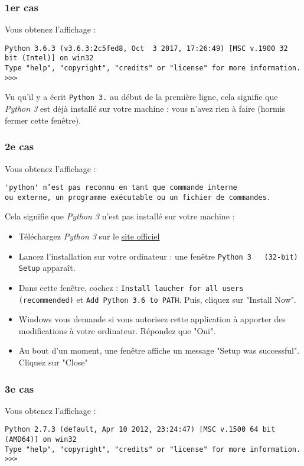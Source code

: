 \documentclass[11pt]{article}
\begin{document}
\subsubsection{1er cas}
\label{sec-2-4-1}
Vous obtenez l'affichage :
\begin{verbatim}
Python 3.6.3 (v3.6.3:2c5fed8, Oct  3 2017, 17:26:49) [MSC v.1900 32 bit (Intel)] on win32
Type "help", "copyright", "credits" or "license" for more information.
>>>
\end{verbatim}

Vu qu'il y a écrit \verb~Python 3.~ au début de la première ligne, cela
signifie que \emph{Python 3} est déjà installé sur votre machine : vous
n'avez rien à faire (hormis fermer cette fenêtre).
\subsubsection{2e cas}
\label{sec-2-4-2}
Vous obtenez l'affichage :
\begin{verbatim}
'python' n’est pas reconnu en tant que commande interne
ou externe, un programme exécutable ou un fichier de commandes.
\end{verbatim}

Cela signifie que \emph{Python 3} n'est pas installé sur votre machine :
\begin{itemize}
\item Téléchargez \emph{Python 3} sur le \href{https://www.python.org/downloads/}{site officiel}
\item Lancez l'installation sur votre ordinateur : une fenêtre \verb~Python 3   (32-bit) Setup~ apparaît.
\item Dans cette fenêtre, cochez : \verb~Install laucher for all users   (recommended)~ et \verb~Add Python 3.6 to PATH~. Puis, cliquez sur
"Install Now".
\item Windows vous demande si vous autorisez cette application à apporter
des modifications à votre ordinateur. Répondez que "Oui".
\item Au bout d'un moment, une fenêtre affiche un message "Setup was
successful". Cliquez sur "Close"
\end{itemize}
\subsubsection{3e cas}
\label{sec-2-4-3}
Vous obtenez l'affichage :
\begin{verbatim}
Python 2.7.3 (default, Apr 10 2012, 23:24:47) [MSC v.1500 64 bit (AMD64)] on win32
Type "help", "copyright", "credits" or "license" for more information.
>>>
\end{verbatim}
\end{document}
